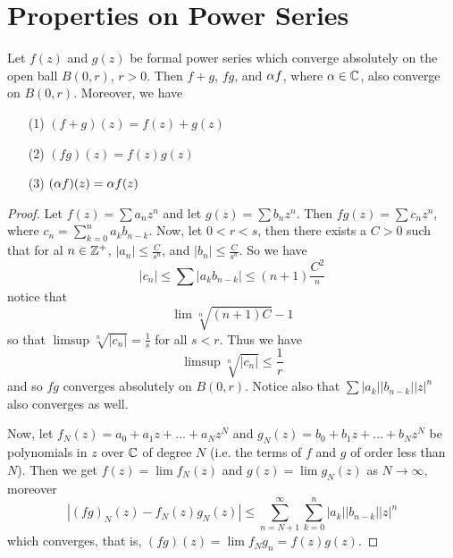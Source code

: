 \section{Properties on Power Series}

\begin{theorem}\label{2.3.1}
    Let $f(z)$ and $g(z)$ be formal power series which converge absolutely on
    the open ball $B(0,r)$, $r>0$. Then  $f+g$, $fg$, and $\alpha f$, where  $\alpha
    \in\mathbb{C}$, also converge on  $B(0,r)$. Moreover, we have
    \begin{enumerate}
        \item[(1)] $(f+g)(z)=f(z)+g(z)$

        \item[(2)] $(fg)(z)=f(z)g(z)$

        \item[(3)] $(\alpha f)(z)=\alpha f(z)$
    \end{enumerate}
\end{theorem}
\begin{proof}
    Let $f(z)=\sum{a_nz^n}$ and let $g(z)=\sum{b_nz^n}$. Then
    $fg(z)=\sum{c_nz^n}$, where $c_n=\sum_{k=0}^n{a_kb_{n-k}}$. Now, let
    $0<r<s$, then there exists a  $C>0$ such that for al  $n \in \mathbb{Z}^+$,  $|a_n|
    \leq \frac{C}{s^n}$, and $|b_n| \leq \frac{C}{s^n}$. So we have
    \begin{equation*}
        |c_n| \leq \sum{|a_kb_{n-k}|} \leq (n+1)\frac{C^2}{^n}
    \end{equation*}
    notice that
    \begin{equation*}
        \lim{\sqrt[n]{(n+1)C}}-1
    \end{equation*}
    so that $\limsup{\sqrt[n]{|c_n|}}=\frac{1}{s}$ for all $s<r$. Thus we have
    \begin{equation*}
        \limsup{\sqrt[n]{|c_n|}} \leq \frac{1}{r}
    \end{equation*}
    and so $fg$ converges absolutely on  $B(0,r)$. Notice also that
    $\sum{|a_k||b_{n-k}||z|^n}$ also converges as well.

    Now, let $f_N(z)=a_0+a_1z+\dots+a_Nz^N$ and $g_N(z)=b_0+b_1z+\dots+b_Nz^N$
    be polynomials in $z$ over  $\mathbb{C}$ of degree $N$ (i.e. the terms of $f$ and
    $g$ of order less than  $N$). Then we get $f(z)=\lim{f_N(z)}$ and
    $g(z)=\lim{g_N(z)}$ as $N \xrightarrow{} \infty$, moreover
    \begin{equation*}
        |(fg)_N(z)-f_N(z)g_N(z)| \leq \sum_{n=N+1}^\infty{\sum_{k=0}^n{|a_k||b_{n-k}||z|^n}}
    \end{equation*}
    which converges, that is, $(fg)(z)=\lim{f_Ng_n}=f(z)g(z)$.
\end{proof}

